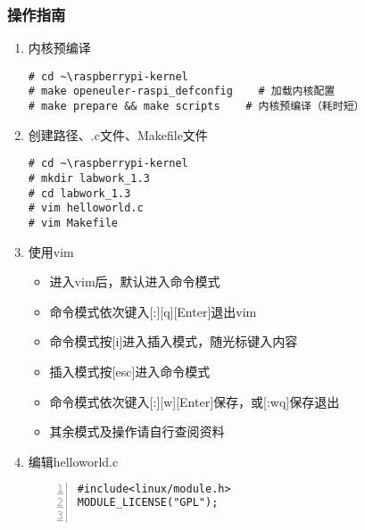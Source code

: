 \documentclass{article}
\begin{document}
\subsubsection{操作指南}
\begin{enumerate}
	\item 内核预编译
	      \begin{lstlisting}
# cd ~\raspberrypi-kernel
# make openeuler-raspi_defconfig    # 加载内核配置
# make prepare && make scripts    # 内核预编译（耗时短）
\end{lstlisting}
	\item 创建路径、.c文件、Makefile文件
	      \begin{lstlisting}
# cd ~\raspberrypi-kernel
# mkdir labwork_1.3
# cd labwork_1.3
# vim helloworld.c
# vim Makefile
\end{lstlisting}
	\item 使用vim
	      \begin{itemize}
		      \item 进入vim后，默认进入命令模式
		      \item 命令模式依次键入[:][q][Enter]退出vim
		      \item 命令模式按[i]进入插入模式，随光标键入内容
		      \item 插入模式按[esc]进入命令模式
		      \item 命令模式依次键入[:][w][Enter]保存，或[:wq]保存退出
		      \item 其余模式及操作请自行查阅资料
	      \end{itemize}
	\item 编辑helloworld.c
	      \begin{lstlisting}[numbers=left]
#include<linux/module.h>
MODULE_LICENSE("GPL");


\end{lstlisting}
\end{enumerate}
\end{document}
